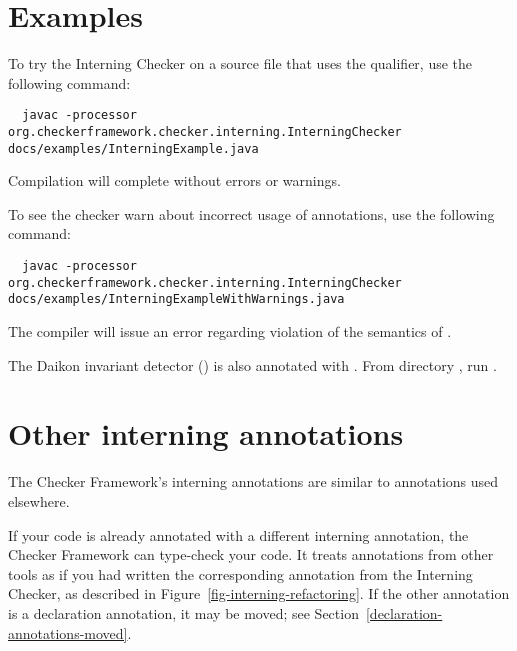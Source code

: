 \section{Examples\label{interning-example}}

To try the Interning Checker on a source file that uses the  qualifier,
use the following command:

\begin{mysmall}
\begin{Verbatim}
  javac -processor org.checkerframework.checker.interning.InterningChecker docs/examples/InterningExample.java
\end{Verbatim}
\end{mysmall}

\noindent
Compilation will complete without errors or warnings.

To see the checker warn about incorrect usage of annotations, use the following
command:

\begin{mysmall}
\begin{Verbatim}
  javac -processor org.checkerframework.checker.interning.InterningChecker docs/examples/InterningExampleWithWarnings.java
\end{Verbatim}
\end{mysmall}

\noindent
The compiler will issue an error regarding violation of the semantics of
.


The Daikon invariant detector
() is also annotated with
.  From directory ,
run .



\section{Other interning annotations\label{other-interning-annotations}}

The Checker Framework's interning annotations are similar to annotations used
elsewhere.

If your code is already annotated with a different interning
annotation, the Checker Framework can type-check your code.
It treats annotations from other tools
as if you had written the corresponding annotation from the
Interning Checker, as described in Figure~\ref{fig-interning-refactoring}.
If the other annotation is a declaration annotation, it may be moved; see
Section~\ref{declaration-annotations-moved}.


